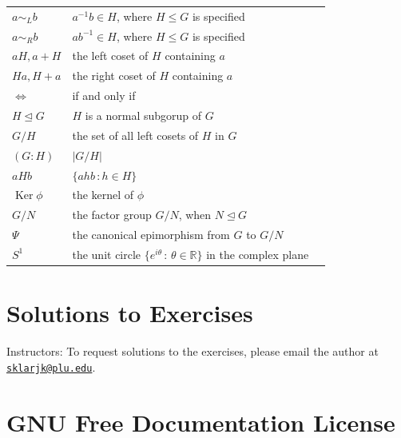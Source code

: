 \documentclass[10pt,openany,oneside]{book}
\theoremstyle{plain}
\theoremstyle{definition}
\theoremstyle{definition}
\theoremstyle{definition}
\theoremstyle{definition}
\numberwithin{equation}{section}
\def\R{\mathbb{R}}
\DeclareMathOperator{\Ker}{Ker}
\def\siml{\sim_L}
\def\simr{\sim_R}
\begin{document}
\begin{longtable}[l]{lp{}r}
\(a\siml b\)&\(a^{-1}b\in H\), where \(H\leq G\) is specified&\pageref{notation-66}\\
\(a\simr b\)&\(ab^{-1}\in H\), where \(H\leq G\) is specified&\pageref{notation-67}\\
\(aH, a+H\)&the left coset of \(H\) containing \(a\)&\pageref{notation-68}\\
\(Ha, H+a\)&the right coset of \(H\) containing \(a\)&\pageref{notation-69}\\
\(\Leftrightarrow\)&if and only if&\pageref{notation-70}\\
\(H\unlhd G\)&\(H\) is a normal subgorup of \(G\)&\pageref{notation-71}\\
\(G/H\)&the set of all left cosets of \(H\) in \(G\)&\pageref{notation-72}\\
\((G:H)\)&\(|G/H|\)&\pageref{notation-73}\\
\(aHb\)&\(\{ahb\,:h\in H\}\)&\pageref{notation-74}\\
\(\Ker \phi\)&the kernel of \(\phi\)&\pageref{notation-75}\\
\(G/N\)&the factor group \(G/N\), when \(N\unlhd G\)&\pageref{notation-76}\\
\(\Psi\)&the canonical epimorphism from \(G\) to \(G/N\)&\pageref{notation-77}\\
\(S^1\)&the unit circle  \(\{e^{i\theta} \,:\, \theta\in
\R\}\) in the complex plane&\pageref{notation-78}\\
\end{longtable}
\typeout{************************************************}
\typeout{************************************************}
\chapter[{Solutions to Exercises}]{Solutions to Exercises}\label{appendix-2}
Instructors: To request solutions to the exercises, please email the author at  \href{mailto:sklarjk@plu.edu}{\nolinkurl{sklarjk@plu.edu}}.%
\typeout{************************************************}
\typeout{************************************************}
\chapter[{GNU Free Documentation License}]{GNU Free Documentation License}\label{appendix-gfdl}
\typeout{************************************************}
\typeout{************************************************}
\end{document}
